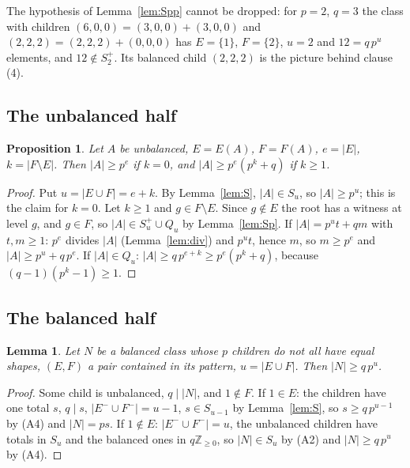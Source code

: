 \documentclass[11pt,a4paper]{amsart}
\newtheorem{proposition}[theorem]{Proposition}
\newtheorem{lemma}[theorem]{Lemma}
\theoremstyle{definition}
\theoremstyle{remark}
\newcommand{\Z}{\mathbb{Z}}
\newcommand{\Sp}{S^{+}}
\begin{document}
The hypothesis of Lemma~\ref{lem:Spp} cannot be dropped: for $p=2$, $q=3$ the class with children
$(6,0,0)=(3,0,0)+(3,0,0)$ and $(2,2,2)=(2,2,2)+(0,0,0)$ has $E=\{1\}$, $F=\{2\}$, $u=2$ and $12=q\,p^u$
elements, and $12\notin\Sp_2$. Its balanced child $(2,2,2)$ is the picture behind clause (4).

\subsection{The unbalanced half}

\begin{proposition}\label{prop:U}
Let $A$ be unbalanced, $E=E(A)$, $F=F(A)$, $e=|E|$, $k=|F\setminus E|$. Then $|A|\ge p^{e}$ if $k=0$, and
$|A|\ge p^{e}(p^{k}+q)$ if $k\ge1$.
\end{proposition}
\begin{proof}
Put $u=|E\cup F|=e+k$. By Lemma~\ref{lem:S}, $|A|\in S_u$, so $|A|\ge p^{u}$; this is the claim for $k=0$.
Let $k\ge1$ and $g\in F\setminus E$. Since $g\notin E$ the root has a witness at level $g$, and $g\in F$, so
$|A|\in\Sp_u\cup Q_u$ by Lemma~\ref{lem:Sp}. If $|A|=p^ut+qm$ with $t,m\ge1$: $p^e$ divides $|A|$
(Lemma~\ref{lem:div}) and $p^ut$, hence $m$, so $m\ge p^e$ and $|A|\ge p^u+q\,p^e$. If $|A|\in Q_u$:
$|A|\ge q\,p^{e+k}\ge p^e(p^k+q)$, because $(q-1)(p^k-1)\ge1$.
\end{proof}

\subsection{The balanced half}

\begin{lemma}\label{lem:bal}
Let $N$ be a balanced class whose $p$ children do not all have equal shapes, $(E,F)$ a pair contained in its
pattern, $u=|E\cup F|$. Then $|N|\ge q\,p^{u}$.
\end{lemma}
\begin{proof}
Some child is unbalanced, $q\mid|N|$, and $1\notin F$. If $1\in E$: the children have one total $s$, $q\mid s$,
$|E^-\cup F^-|=u-1$, $s\in S_{u-1}$ by Lemma~\ref{lem:S}, so $s\ge q\,p^{u-1}$ by (A4) and $|N|=ps$. If
$1\notin E$: $|E^-\cup F^-|=u$, the unbalanced children have totals in $S_u$ and the balanced ones in
$q\Z_{\ge0}$, so $|N|\in S_u$ by (A2) and $|N|\ge q\,p^u$ by (A4).
\end{proof}
\end{document}
